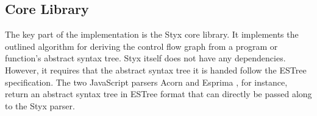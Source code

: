 \subsection{Core Library}
\label{sec:styx-corelib}

The key part of the implementation is the Styx core library. It implements the outlined algorithm for deriving the control flow graph from a program or function's abstract syntax tree. Styx itself does not have any dependencies. However, it requires that the abstract syntax tree it is handed follow the  ESTree \cite{estree-spec} specification. The two JavaScript parsers Acorn \cite{acorn} and Esprima \cite{esprima}, for instance, return an abstract syntax tree in ESTree format that can directly be passed along to the Styx parser.







